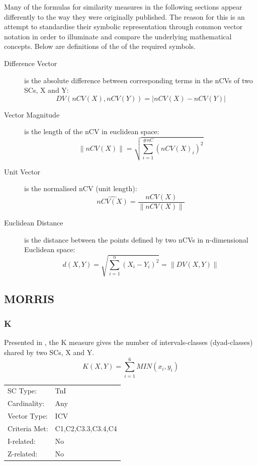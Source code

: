 \documentclass{article}
\begin{document}
Many of the formulas for similarity measures in the following sections
appear differently to the way they were originally published. The
reason for this is an attempt to standardise their symbolic
representation through common vector notation in order to illuminate
and compare the underlying mathematical concepts. Below are
definitions of the of the required symbols.
\begin{description}
\item[Difference Vector] is the absolute
difference between corresponding terms in the nCVs of two SCs, X and Y:\\
$$DV(nCV(X),nCV(Y))=\left|nCV(X)-nCV(Y)\right|$$ \item[Vector
Magnitude] is the length of the nCV in euclidean space:\\
$$\left\|nCV(X)\right\|=\sqrt{\sum_{i=1}^{\#nC}{(nCV(X)_{i})^{2}}}$$
\item[Unit Vector] is the normalised nCV (unit length):\\
$$\hat{nCV(X)}=\frac{nCV(X)}{\left\|nCV(X)\right\|}$$ \item[Euclidean
Distance] is the distance between the points defined by two nCVs in
n-dimensional Euclidean space:\\
$$d(X,Y)=\sqrt{\sum_{i=1}^{n}{(X_{i}-Y_{i})^{2}}}=\left\|DV(X,Y)\right\|$$
\end{description}
\subsection{MORRIS}
\label{sec-11-2}
\subsubsection{K}
\label{sec-11-2-1}

Presented in \citet[pp. 448]{Morris1979}, the K measure gives the
number of intervals-classes (dyad-classes) shared by two SCs, X and Y.
$$ K(X,Y)= \sum_{i=1}^{6}{MIN(x_{i},y_{i})} $$

\begin{center}
\begin{tabular}{ll}
 SC Type:       &  TnI                 \\
 Cardinality:   &  Any                 \\
 Vector Type:   &  ICV                 \\
 Criteria Met:  &  C1,C2,C3.3,C3.4,C4  \\
 I-related:     &  No                  \\
 Z-related:     &  No                  \\
\end{tabular}
\end{center}
\end{document}
